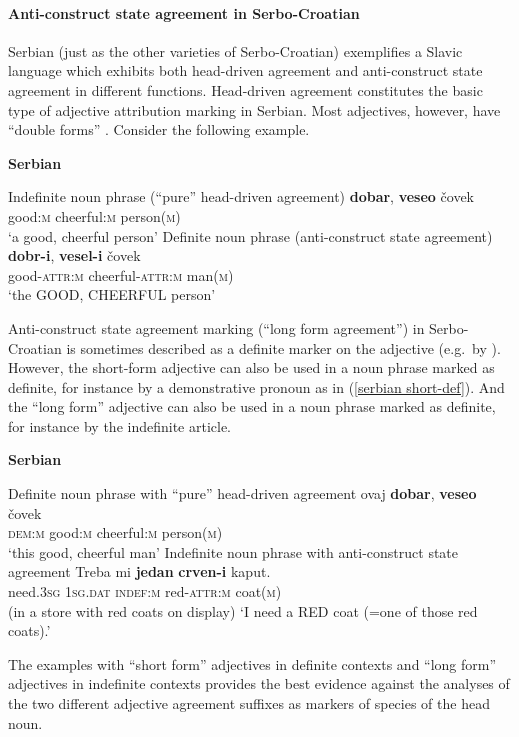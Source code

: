 \paragraph{Anti-construct state agreement in Serbo-Croatian} \label{serbian synchr}
Serbian (just as the other varieties of Serbo-Croatian) exemplifies a Sla\-vic language which exhibits both head-driven agreement and anti-construct state agreement in different functions. Head-driven agreement constitutes the basic type of adjective attribution marking in Serbian. Most adjectives, however, have “double forms” \cite[179–180]{kramsky1972}. Consider the following example.
\begin{exe}
\ex \textbf{Serbian} \citep[59]{zlatic1997}
\begin{xlist}
\ex 	Indefinite noun phrase (“pure” head-driven agreement)
\gll	\textbf{dobar}, \textbf{veseo} čovek\\
	good:\textsc{m} cheerful:\textsc{m} person(\textsc{m})\\
\glt	‘a good, cheerful person’
\ex	Definite noun phrase (anti-construct state agreement)
\gll	\textbf{dobr-i}, \textbf{vesel-i} čovek\\
	good-\textsc{attr:m} cheerful-\textsc{attr:m} man(\textsc{m})\\
\glt	‘the GOOD, CHEERFUL person’
\end{xlist}
\end{exe}
Anti-construct state agreement marking (“long form agreement”) in Serbo-Croatian is sometimes described as a definite marker on the adjective (e.g.~by \citealt[18–19]{kordic1997}). However, the short-form adjective can also be used in a noun phrase marked as definite, for instance by a demonstrative pronoun as in (\ref{serbian short-def}). And the “long form” adjective can also be used in a noun phrase marked as definite, for instance by the indefinite article. 
\begin{exe}
\ex \textbf{Serbian} \citep{marusic-etal2007}
\begin{xlist}
\ex	Definite noun phrase with “pure” head-driven agreement \label{serbian short-def} 
\gll	ovaj \textbf{dobar}, \textbf{veseo} \v{c}ovek\\
	\textsc{dem:m} good:\textsc{m} cheerful:\textsc{m} person(\textsc{m})\\
\glt	‘this good, cheerful man’
\ex 	Indefinite noun phrase with anti-construct state agreement \label{serb indef}
\gll	Treba mi \textbf{jedan} \textbf{crven-i} kaput.\\
	need.\textsc{3sg} \textsc{1sg.dat} \textsc{indef:m} red-\textsc{attr:m} coat(\textsc{m})\\
\glt (in a store with red coats on display) ‘I need a RED coat (=one of those red coats).’
\end{xlist}
\end{exe}
The examples with “short form” adjectives in definite contexts and “long form” adjectives in indefinite contexts provides the best evidence against the analyses of the two different adjective agreement suffixes as markers of species of the head noun. 

